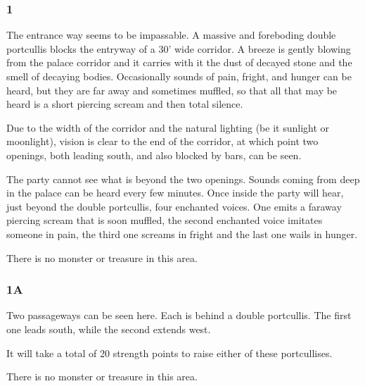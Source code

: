 \documentclass[palace_of_the_silver_princess]{subfiles}
\begin{document}
\selectfont
\clearpage


\subsubsection{1}
\begin{quotebox}
    The entrance way seems to be impassable. A massive and
    foreboding double portcullis blocks the entryway of a 30’
    wide corridor. A breeze is gently blowing from the palace
    corridor and it carries with it the dust of decayed stone
    and the smell of decaying bodies. Occasionally sounds of
    pain, fright, and hunger can be heard, but they are far away
    and sometimes muffled, so that all that may be heard is a
    short piercing scream and then total silence.
\end{quotebox}

Due to the width of the corridor and the natural lighting (be it
sunlight or moonlight), vision is clear to the end of the
corridor, at which point two openings, both leading south, and
also blocked by bars, can be seen.

The party cannot see what is beyond the two openings. Sounds
coming from deep in the palace can be heard every few minutes.
Once inside the party will hear, just beyond the double
portcullis, four enchanted voices. One emits a faraway piercing
scream that is soon muffled, the second enchanted voice imitates
someone in pain, the third one screams in fright and the last
one wails in hunger.

There is no monster or treasure in this area.

\subsubsection{1A}
\begin{quotebox}
    Two passageways can be seen here. Each is behind a
    double portcullis. The first one leads south, while
    the second extends west.
\end{quotebox}

It will take a total of 20 strength points to raise
either of these portcullises.

There is no monster or treasure in this area.
\end{document}
